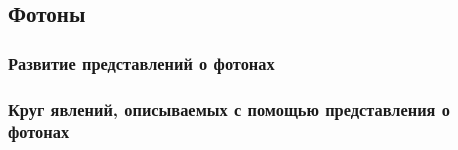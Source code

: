 \subsection{Фотоны}
\subsubsection{Развитие представлений о фотонах}
\subsubsection{Круг явлений, описываемых с помощью представления о фотонах}